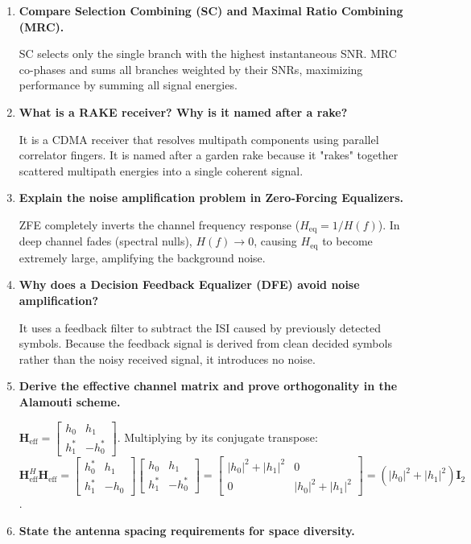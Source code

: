 \documentclass[12pt,a4paper]{article}
\newcommand{\Q}[1]{\textbf{#1}\par\noindent\ignorespaces}
\begin{document}
\begin{tcolorbox}[exambox, title={\textbf{Frequently Asked / Viva Questions}}]
\begin{enumerate}[topsep=0pt, label=\textbf{Q\arabic*.}, itemsep=5pt]
  \item \Q{Compare Selection Combining (SC) and Maximal Ratio Combining (MRC).}
    SC selects only the single branch with the highest instantaneous SNR. MRC co-phases and sums all branches weighted by their SNRs, maximizing performance by summing all signal energies.
  \item \Q{What is a RAKE receiver? Why is it named after a rake?}
    It is a CDMA receiver that resolves multipath components using parallel correlator fingers. It is named after a garden rake because it "rakes" together scattered multipath energies into a single coherent signal.
  \item \Q{Explain the noise amplification problem in Zero-Forcing Equalizers.}
    ZFE completely inverts the channel frequency response ($H_{\text{eq}} = 1/H(f)$). In deep channel fades (spectral nulls), $H(f) \to 0$, causing $H_{\text{eq}}$ to become extremely large, amplifying the background noise.
  \item \Q{Why does a Decision Feedback Equalizer (DFE) avoid noise amplification?}
    It uses a feedback filter to subtract the ISI caused by previously detected symbols. Because the feedback signal is derived from clean decided symbols rather than the noisy received signal, it introduces no noise.
  \item \Q{Derive the effective channel matrix and prove orthogonality in the Alamouti scheme.}
    $\mathbf{H}_{\text{eff}} = \begin{bmatrix} h_0 & h_1 \\ h_1^* & -h_0^* \end{bmatrix}$. Multiplying by its conjugate transpose: $\mathbf{H}_{\text{eff}}^H \mathbf{H}_{\text{eff}} = \begin{bmatrix} h_0^* & h_1 \\ h_1^* & -h_0 \end{bmatrix} \begin{bmatrix} h_0 & h_1 \\ h_1^* & -h_0^* \end{bmatrix} = \begin{bmatrix} |h_0|^2+|h_1|^2 & 0 \\ 0 & |h_0|^2+|h_1|^2 \end{bmatrix} = (|h_0|^2+|h_1|^2)\mathbf{I}_2$.
  \item \Q{State the antenna spacing requirements for space diversity.}

\end{enumerate}
\end{tcolorbox}
\end{document}
